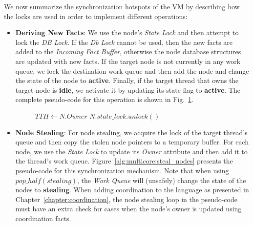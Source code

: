 
We now summarize the synchronization hotspots of the VM by describing how the locks
are used in order to implement different operations:

\begin{itemize}

   \item \textbf{Deriving New Facts}: We use the node's \emph{State Lock} and
      then attempt to lock the \emph{DB Lock}. If the \emph{Db Lock} cannot be
      used, then the new facts are added to the \emph{Incoming Fact Buffer},
      otherwise the node database structures are updated with new facts. If the
      target node is not currently in any work queue, we lock the destination
      work queue and then add the node and change the state of the node to
      \textbf{active}. Finally, if the target thread that owns the target node
      is \textbf{idle}, we activate it by updating its state flag to
      \textbf{active}. The complete pseudo-code for this operation is shown in
      Fig.~\ref{alg:multicore:new_fact}.

\begin{figure}
\begin{algorithm}[H]
   $TTH \longleftarrow N.Owner$\;
   $N.state\_lock.unlock()$\;
\end{algorithm}
 \label{alg:multicore:new_fact}
\end{figure}


   \item \textbf{Node Stealing}: For node stealing, we acquire the lock of the
      target thread's queue and then copy the stolen node pointers to a
      temporary buffer. For each node, we use the \emph{State Lock} to update
      its \emph{Owner} attribute and then add it to the thread's work queue.
      Figure~\ref{alg:multicore:steal_nodes} presents the pseudo-code for this
      synchronization mechanism. Note that when using $pop\_half(stealing)$, the
      \emph{Work Queue} will (unsafely) change the state of the nodes to
      \textbf{stealing}. When adding coordination to the language as presented
      in Chapter~\ref{chapter:coordination}, the node stealing loop in the
      pseudo-code must have an extra check for cases when the node's owner is
      updated using coordination facts.


\end{itemize}
